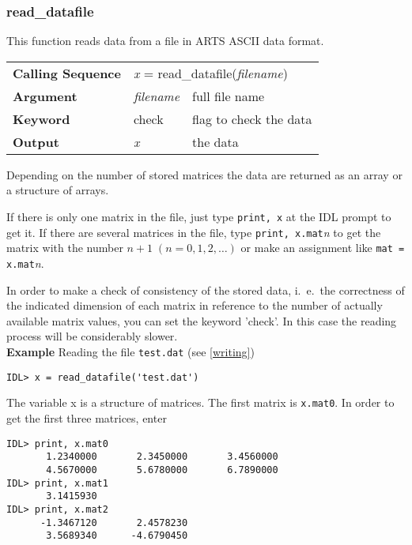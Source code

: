 \subsubsection{read\_datafile}
This function reads data from a file in ARTS ASCII data format.
\begin{center}
\begin{tabular}{|l|ll|}
  \hline
  \textbf{Calling Sequence} &
  \multicolumn{2}{l|}{\textit{x} = %
  {\ttfamily read\_datafile(\textnormal{\textit{filename}})}}     \\ 
  \textbf{Argument} & \textit{filename} & full file name          \\
  \textbf{Keyword}  & check             & flag to check the data  \\
  \textbf{Output}   & \textit{x}        & the data                \\
  \hline
\end{tabular}
\end{center}
Depending on the number of stored matrices the data are returned as an
array or a structure of arrays.

If there is only one matrix in the file, just type \hspace{1ex}
\texttt{print, x} \hspace{1ex} at the IDL prompt to get it. If there
are several matrices in the file, type \hspace{1ex} \texttt{print, 
x.mat}\textit{n} \hspace{1ex} to get the matrix with the number $n +
1\;( n = 0, 1, 2, \ldots)$ or make an assignment like \hspace{1ex}
\texttt{mat = x.mat}\textit{n}.

In order to make a check of consistency of the stored data, i.~e.\ 
the correctness of the indicated dimension of each matrix in reference
to the  number of actually available matrix values, you can set the
keyword 'check'. In this case the reading process will be considerably
slower. \\
\textbf{Example} \hspace{1ex} Reading the file \texttt{test.dat} (see
\ref{writing})
\begin{verbatim}
IDL> x = read_datafile('test.dat')
\end{verbatim}
The variable x is a structure of matrices. The first matrix is
\texttt{x.mat0}. In order to get the first three matrices, enter
\begin{verbatim}
IDL> print, x.mat0
       1.2340000       2.3450000       3.4560000
       4.5670000       5.6780000       6.7890000
IDL> print, x.mat1
       3.1415930
IDL> print, x.mat2
      -1.3467120       2.4578230
       3.5689340      -4.6790450
\end{verbatim}
